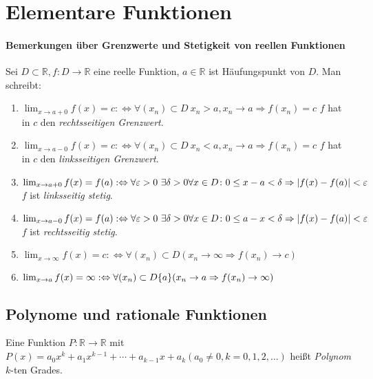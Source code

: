 \documentclass[ngerman,titlepage,twoside, parskip=half*]{scrreprt}
\newcommand*{\R}{\mathbb{R}}
\newcommand*{\perdef}{:\Leftrightarrow}
\theoremstyle{break}
\theoremstyle{nonumberbreak}
\DeclarePairedDelimiter{\abs}{\lvert}{\rvert}
\begin{document}
\section{Elementare Funktionen}
\paragraph{Bemerkungen über Grenzwerte und Stetigkeit von reellen Funktionen}

Sei $D\subset \R , f\colon D\rightarrow \R$ eine reelle Funktion, $a\in\R$ ist Häufungspunkt von $D$. Man schreibt:
\begin{enumerate}[(1)]
  \item $\lim_{x\rightarrow a+0}f(x)=c\perdef \forall (x_n)\subset D\ x_n>a,x_n\rightarrow a\Rightarrow f(x_n)=c$ $f$ hat in $c$
    den \emph{rechtsseitigen Grenzwert}.
  \item $\lim_{x\rightarrow a-0}f(x)=c\perdef \forall (x_n)\subset D\ x_n<a,x_n\rightarrow a\Rightarrow f(x_n)=c$ $f$ hat in $c$
    den \emph{linksseitigen Grenzwert}.
  \item $\lim_{x\rightarrow a+0}f(x)=f(a)\perdef \forall \varepsilon >0\ \exists \delta >0 \forall x \in D\colon 0\leq x-a<\delta
    \Rightarrow \abs{f(x)-f(a)}<\varepsilon$ $f$ ist \emph{linksseitig stetig}.
  \item $\lim_{x\rightarrow a-0}f(x)=f(a)\perdef \forall \varepsilon >0\ \exists \delta >0 \forall x \in D\colon 0\leq a-x<\delta
    \Rightarrow \abs{f(x)-f(a)}<\varepsilon$ $f$ ist \emph{rechtsseitig stetig}.
  \item $\lim_{x\rightarrow\infty} f(x)=c\perdef \forall (x_n)\subset D (x_n \rightarrow \infty \Rightarrow f(x_n)\rightarrow c)$
  \item $\lim_{x\rightarrow a} f(x)=\infty\perdef \forall (x_n)\subset D\\\{a\} (x_n \rightarrow a \Rightarrow f(x_n)\rightarrow \infty)$
\end{enumerate}

\subsection{Polynome und rationale Funktionen}

Eine Funktion $P\colon\R\rightarrow \R$ mit $P(x)=a_0x^k+a_1x^{k-1}+\cdots + a_{k-1}x+a_k (a_0\neq 0, k=0,1,2,\ldots)$ heißt
\emph{Polynom} $k$-ten Grades.
\end{document}
